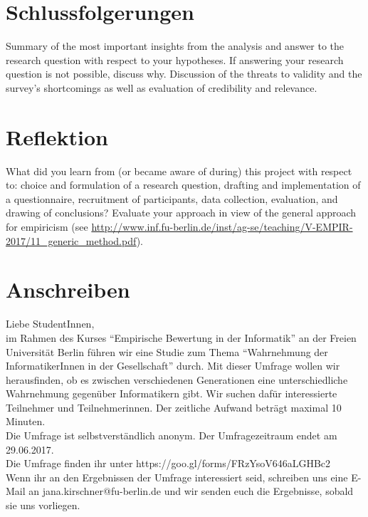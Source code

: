 \documentclass[de]{agse-empir-report}\usepackage[]{graphicx}\usepackage[]{color}
\begin{document}
\section[]{Schlussfolgerungen}
Summary of the most important insights from the analysis and
answer to the research question with respect to your hypotheses.
If answering your research question is not possible, discuss why.
Discussion of the threats to validity and the survey's
shortcomings as well as evaluation of credibility and relevance.


\section[]{Reflektion}

What did you learn from (or became aware of during) this project with
respect to: choice and formulation of a research question,
drafting and implementation of a questionnaire,
recruitment of participants,
data collection, evaluation, and drawing of conclusions?
Evaluate your approach in view of the general approach for
empiricism (see
\url{http://www.inf.fu-berlin.de/inst/ag-se/teaching/V-EMPIR-2017/11_generic_method.pdf}).


\nocite{*}




\appendix

\section{Anschreiben}

Liebe StudentInnen,\\
im Rahmen des Kurses “Empirische Bewertung in der Informatik” an der Freien Universität Berlin führen wir eine Studie zum Thema “Wahrnehmung der InformatikerInnen in der Gesellschaft” durch. Mit dieser Umfrage wollen wir herausfinden, ob es zwischen verschiedenen Generationen eine unterschiedliche Wahrnehmung gegenüber Informatikern gibt. Wir suchen dafür interessierte Teilnehmer und Teilnehmerinnen. Der zeitliche Aufwand beträgt maximal 10 Minuten.\\
Die Umfrage ist selbstverständlich anonym. Der Umfragezeitraum endet am 29.06.2017.\\

Die Umfrage finden ihr  unter https://goo.gl/forms/FRzYsoV646aLGHBc2 \\

Wenn ihr an den Ergebnissen der Umfrage interessiert seid, schreiben uns eine E-Mail an jana.kirschner@fu-berlin.de und wir senden euch die Ergebnisse, sobald sie uns vorliegen.\\ \\
\end{document}

